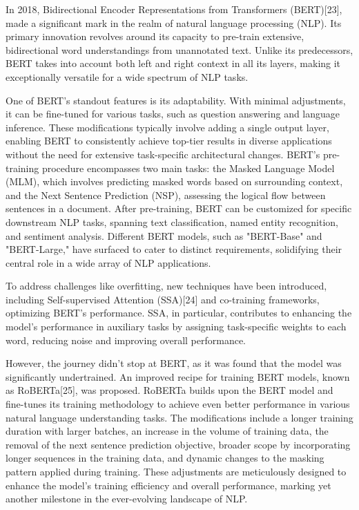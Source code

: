 \documentclass[conference]{IEEEtran}
\begin{document}
In 2018, Bidirectional Encoder Representations from Transformers (BERT)[23], made a significant mark in the realm of natural language processing (NLP). Its primary innovation revolves around its capacity to pre-train extensive, bidirectional word understandings from unannotated text. Unlike its predecessors, BERT takes into account both left and right context in all its layers, making it exceptionally versatile for a wide spectrum of NLP tasks.

One of BERT's standout features is its adaptability. With minimal adjustments, it can be fine-tuned for various tasks, such as question answering and language inference. These modifications typically involve adding a single output layer, enabling BERT to consistently achieve top-tier results in diverse applications without the need for extensive task-specific architectural changes. BERT's pre-training procedure encompasses two main tasks: the Masked Language Model (MLM), which involves predicting masked words based on surrounding context, and the Next Sentence Prediction (NSP), assessing the logical flow between sentences in a document. After pre-training, BERT can be customized for specific downstream NLP tasks, spanning text classification, named entity recognition, and sentiment analysis. Different BERT models, such as "BERT-Base" and "BERT-Large," have surfaced to cater to distinct requirements, solidifying their central role in a wide array of NLP applications.


To address challenges like overfitting, new techniques have been introduced, including Self-supervised Attention (SSA)[24] and co-training frameworks, optimizing BERT's performance. SSA, in particular, contributes to enhancing the model's performance in auxiliary tasks by assigning task-specific weights to each word, reducing noise and improving overall performance.


However, the journey didn't stop at BERT, as it was found that the model was significantly undertrained. An improved recipe for training BERT models, known as RoBERTa[25], was proposed. RoBERTa builds upon the BERT model and fine-tunes its training methodology to achieve even better performance in various natural language understanding tasks. The modifications include a longer training duration with larger batches, an increase in the volume of training data, the removal of the next sentence prediction objective, broader scope by incorporating longer sequences in the training data, and dynamic changes to the masking pattern applied during training. These adjustments are meticulously designed to enhance the model's training efficiency and overall performance, marking yet another milestone in the ever-evolving landscape of NLP.
\end{document}
